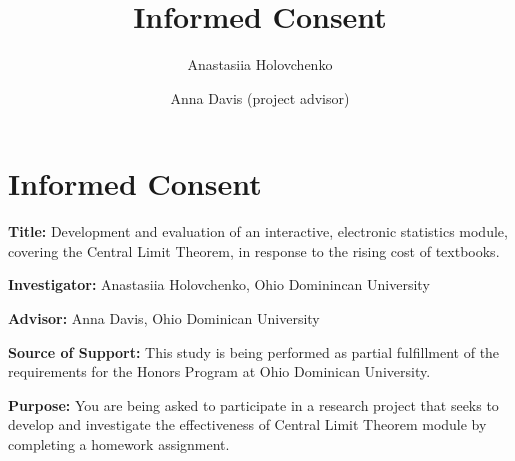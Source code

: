 \documentclass{ximera}
\author{Anastasiia Holovchenko \and Anna Davis (project advisor)} \title{Informed Consent}
\begin{document}
\begin{abstract}
\end{abstract}
\maketitle

\section{Informed Consent}
\textbf{Title:} Development and evaluation of an interactive, electronic statistics module, covering the Central Limit Theorem, in response to the rising cost of textbooks.

\textbf{Investigator:} Anastasiia Holovchenko, Ohio Dominincan University

\textbf{Advisor:} Anna Davis, Ohio Dominican University

\textbf{Source of Support:} This study is being performed as partial fulfillment of the requirements for the Honors Program at Ohio Dominican University.

\textbf{Purpose:} You are being asked to participate in a research project that seeks to develop and investigate the effectiveness of Central Limit Theorem module by completing a homework assignment.
\end{document}

